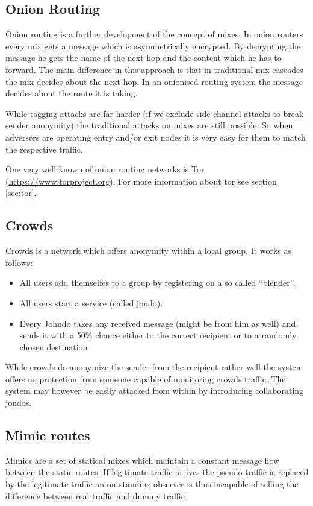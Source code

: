 \subsection{Onion Routing}
Onion routing is a further development of the concept of mixes. In onion routers every mix gets a message which is asymmetrically encrypted. By decrypting the message he gets the name of the next hop and the content which he has to forward. The main difference in this approach is that in traditional mix cascades the mix decides about the next hop. In an onionised routing system the message decides about the route it is taking. 

While tagging attacks are far harder (if we exclude side channel attacks to break sender anonymity) the traditional attacks on mixes are still possible. So when adversers are operating entry and/or exit nodes it is very easy for them to match the respective traffic.

One very well known of onion routing networks is Tor (\href{https://www.torproject.org}{https://www.torproject.org}). For more information about tor see section \ref{sec:tor}.


\subsection{Crowds}
Crowds is a network which offers anonymity within a local group. It works as follows:
\begin{itemize}
	\item All users add themselfes to a group by registering on a so called ``blender''.
	\item All users start a service (called jondo).
	\item Every Johndo takes any received message (might be from him as well) and sends it with a 50\% chance either to the correct recipient or to a randomly chosen destination
\end{itemize}
While crowds do anonymize the sender from the recipient rather well the system offers no protection from someone capable of monitoring crowds traffic. The system may however be easily attacked from within by introducing collaborating jondos. 


\subsection{Mimic routes}
Mimics are a set of statical mixes which maintain a constant message flow between the static routes. If legitimate traffic arrives the pseudo traffic is replaced by the legitimate traffic an outstanding observer is thus incapable of telling the difference between real traffic and dummy traffic.

